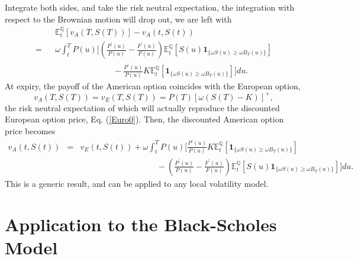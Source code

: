 \documentclass[12pt]{article}
\begin{document}
    Integrate both sides, and take the risk neutral expectation, the integration with respect to the Brownian motion
    will drop out, we are left with
    \begin{eqnarray}
      &&{\mathbb E}_t^{\mathbb Q}\left[v_A(T,S(T))\right]-v_A(t,S(t)) \nonumber\\
      = &&\omega\int_t^T P(u)\Bigg[\left(\frac{P^{\prime}(u)}{P(u)}-\frac{F^{\prime}(u)}{F(u)}\right)
                          {\mathbb E}_t^{\mathbb Q}\left[S(u)\mathbf{1}_{\{\omega S(u)\geq\omega B_T(u)\}}\right]\nonumber\\
        &&\quad\quad\quad\quad\quad\quad\quad- \frac{P^{\prime}(u)}{P(u)} K
                          {\mathbb E}_t^{\mathbb Q}\left[\mathbf{1}_{\{\omega S(u)\geq\omega B_T(u)\}}\right] \Bigg]du.
    \end{eqnarray}
    At expiry, the payoff of the American option coincides with the European option,
    \begin{equation}
      v_A(T,S(T)) = v_E(T,S(T))=P(T)\left[\omega\left(S(T)-K\right)\right]^+,
    \end{equation}
    the risk neutral expectation of which will actually reproduce the discounted European option price, Eq. (\ref{Euro0}).
    Then, the discounted American option price becomes
    \begin{eqnarray}
      \label{EEP0}
      v_A(t,S(t)) &=& v_E(t,S(t))
      +\omega\int_t^T P(u)\Bigg[\frac{P^{\prime}(u)}{P(u)} K
      {\mathbb E}_t^{\mathbb Q}\left[\mathbf{1}_{\{\omega S(u)\geq\omega B_T(u)\}}\right]\nonumber\\
      &&\quad\quad\quad\quad\quad\quad\quad\quad\quad\ -\left(\frac{P^{\prime}(u)}{P(u)}-\frac{F^{\prime}(u)}{F(u)}\right)
      {\mathbb E}_t^{\mathbb Q}\left[S(u)\mathbf{1}_{\{\omega S(u)\geq\omega B_T(u)\}}\right]\Bigg]du.
    \end{eqnarray}
    This is a generic result, and can be applied to any local volatility model.

  \section{Application to the Black-Scholes Model}
\end{document}
